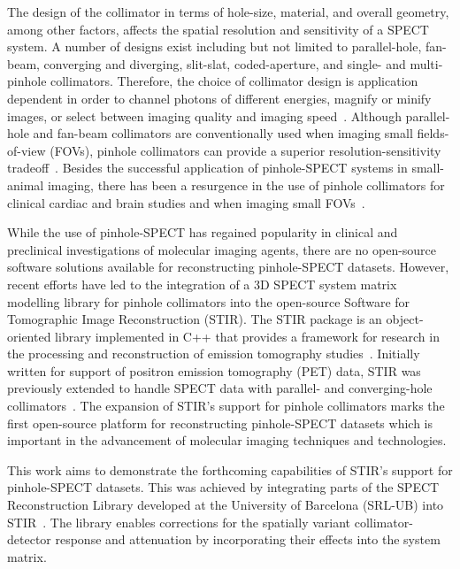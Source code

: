 \documentclass[utf8]{FrontiersinHarvard} %
\begin{document}
The design of the collimator in terms of hole-size, material, and overall geometry, among other factors, affects the spatial resolution and sensitivity of a SPECT system. A number of designs exist including but not limited to parallel-hole, fan-beam, converging and diverging, slit-slat, coded-aperture, and single- and multi-pinhole collimators. Therefore, the choice of collimator design is application dependent in order to channel photons of different energies, magnify or minify images, or select between imaging quality and imaging speed~\cite{nuclearfields.com}. Although parallel-hole and fan-beam collimators are conventionally used when imaging small fields-of-view (FOVs), pinhole collimators can provide a superior resolution-sensitivity tradeoff~\cite{collimators, recall Dr. Mawko's book}. Besides the successful application of pinhole-SPECT systems in small-animal imaging, there has been a resurgence in the use of pinhole collimators for clinical cardiac and brain studies and when imaging small FOVs~\cite{ozashin_clinical_2020}.

While the use of pinhole-SPECT has regained popularity in clinical and preclinical investigations of molecular imaging agents, there are no open-source software solutions available for reconstructing pinhole-SPECT datasets.  However, recent efforts have led to the integration of a 3D SPECT system matrix modelling library for pinhole collimators into the open-source Software for Tomographic Image Reconstruction (STIR). The STIR package is an object-oriented library implemented in C++ that provides a framework for research in the processing and reconstruction of emission tomography studies~\cite{thielemans_stir_2012}. Initially written for support of positron emission tomography (PET) data, STIR was previously extended to handle SPECT data with parallel- and converging-hole collimators~\cite{fuster_integration_2013a, fuster_integration_2013b}. The expansion of STIR's support for pinhole collimators marks the first open-source platform for reconstructing pinhole-SPECT datasets which is important in the advancement of molecular imaging techniques and technologies. 


This work aims to demonstrate the forthcoming capabilities of STIR's support for pinhole-SPECT datasets. This was achieved by integrating parts of the SPECT Reconstruction Library developed at the University of Barcelona (SRL-UB) into STIR~\cite{Refs. 2-5 in SPECTUB}. The library enables corrections for the spatially variant collimator-detector response and attenuation by incorporating their effects into the system matrix.
\end{document}
